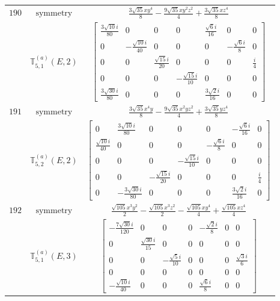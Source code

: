 \documentclass[fleqn,8pt,landscape]{jsarticle}
\begin{document}
\begin{longtable}{ccc}
$ 190 $ & $ \text{symmetry} $ & $ \frac{3 \sqrt{35} x y^{4}}{8} - \frac{9 \sqrt{35} x y^{2} z^{2}}{4} + \frac{3 \sqrt{35} x z^{4}}{8} $ \\
$  $ & $ \mathbb{T}_{5,1}^{(a)}(E,2) $ & $ \begin{bmatrix} \frac{3 \sqrt{10} i}{80} & 0 & 0 & 0 & \frac{\sqrt{6} i}{16} & 0 & 0 \\ 0 & - \frac{\sqrt{10} i}{40} & 0 & 0 & 0 & - \frac{\sqrt{6} i}{8} & 0 \\ 0 & 0 & \frac{\sqrt{15} i}{20} & 0 & 0 & 0 & \frac{i}{4} \\ 0 & 0 & 0 & - \frac{\sqrt{15} i}{10} & 0 & 0 & 0 \\ \frac{3 \sqrt{30} i}{80} & 0 & 0 & 0 & \frac{3 \sqrt{2} i}{16} & 0 & 0 \end{bmatrix} $ \\ \hline
$ 191 $ & $ \text{symmetry} $ & $ \frac{3 \sqrt{35} x^{4} y}{8} - \frac{9 \sqrt{35} x^{2} y z^{2}}{4} + \frac{3 \sqrt{35} y z^{4}}{8} $ \\
$  $ & $ \mathbb{T}_{5,2}^{(a)}(E,2) $ & $ \begin{bmatrix} 0 & \frac{3 \sqrt{10} i}{80} & 0 & 0 & 0 & - \frac{\sqrt{6} i}{16} & 0 \\ \frac{\sqrt{10} i}{40} & 0 & 0 & 0 & - \frac{\sqrt{6} i}{8} & 0 & 0 \\ 0 & 0 & 0 & - \frac{\sqrt{15} i}{10} & 0 & 0 & 0 \\ 0 & 0 & - \frac{\sqrt{15} i}{20} & 0 & 0 & 0 & \frac{i}{4} \\ 0 & - \frac{3 \sqrt{30} i}{80} & 0 & 0 & 0 & \frac{3 \sqrt{2} i}{16} & 0 \end{bmatrix} $ \\ \hline
$ 192 $ & $ \text{symmetry} $ & $ \frac{\sqrt{105} x^{3} y^{2}}{2} - \frac{\sqrt{105} x^{3} z^{2}}{2} - \frac{\sqrt{105} x y^{4}}{4} + \frac{\sqrt{105} x z^{4}}{4} $ \\
$  $ & $ \mathbb{T}_{5,1}^{(a)}(E,3) $ & $ \begin{bmatrix} - \frac{7 \sqrt{30} i}{120} & 0 & 0 & 0 & - \frac{\sqrt{2} i}{8} & 0 & 0 \\ 0 & \frac{\sqrt{30} i}{15} & 0 & 0 & 0 & 0 & 0 \\ 0 & 0 & - \frac{\sqrt{5} i}{10} & 0 & 0 & 0 & \frac{\sqrt{3} i}{6} \\ 0 & 0 & 0 & 0 & 0 & 0 & 0 \\ - \frac{\sqrt{10} i}{40} & 0 & 0 & 0 & \frac{\sqrt{6} i}{8} & 0 & 0 \end{bmatrix} $ \\ \hline

\end{longtable}
\end{document}
